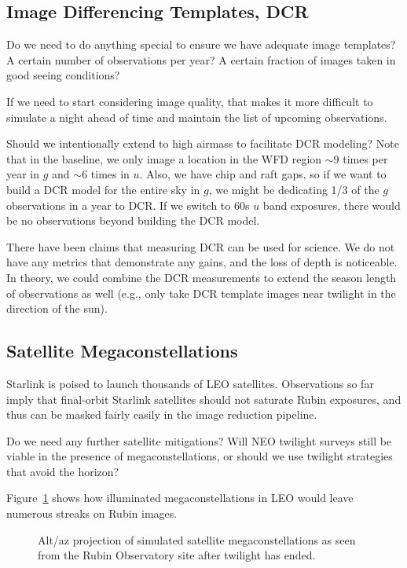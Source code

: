 \subsection{Image Differencing Templates, DCR}

Do we need to do anything special to ensure we have adequate image templates? A certain number of observations per year? A certain fraction of images taken in good seeing conditions? 

If we need to start considering image quality, that makes it more difficult to simulate a night ahead of time and maintain the list of upcoming observations.

Should we intentionally extend to high airmass to facilitate DCR modeling? Note that in the baseline, we only image a location in the WFD region $\sim$9 times per year in $g$ and $\sim$6 times in $u$. Also, we have chip and raft gaps, so if we want to build a DCR model for the entire sky in $g$, we might be dedicating 1/3 of the $g$ observations in a year to DCR. If we switch to 60s $u$ band exposures, there would be no observations beyond building the DCR model. 

There have been claims that measuring DCR can be used for science.  We do not have any metrics that demonstrate any gains, and the loss of depth is noticeable. In theory, we could combine the DCR measurements to extend the season length of observations as well (e.g., only take DCR template images near twilight in the direction of the sun).

\subsection{Satellite Megaconstellations}

Starlink is poised to launch thousands of LEO satellites. Observations so far imply that final-orbit Starlink satellites should not saturate Rubin exposures, and thus can be masked fairly easily in the image reduction pipeline. 

Do we need any further satellite mitigations? Will NEO twilight surveys still be viable in the presence of megaconstellations, or should we use twilight strategies that avoid the horizon?

Figure~\ref{fig:megasat} shows how illuminated megaconstellations in LEO would leave numerous streaks on Rubin images.

\begin{figure}
\caption{Alt/az projection of simulated satellite megaconstellations as seen from the Rubin Observatory site after twilight has ended. } \label{fig:megasat}
\end{figure}

